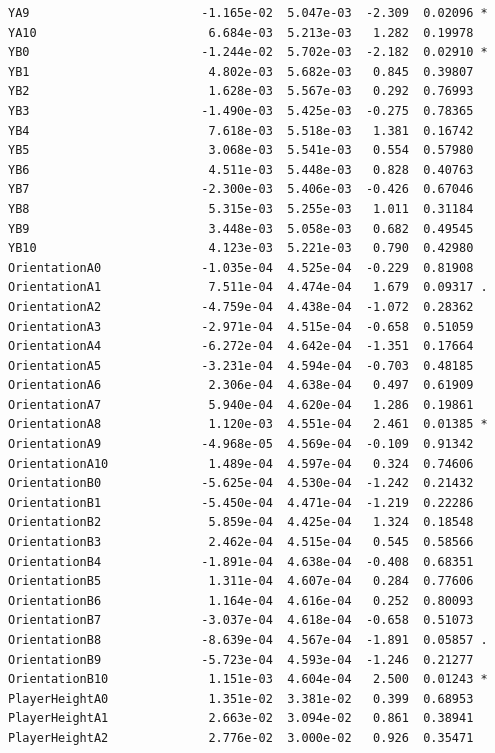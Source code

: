 \documentclass[
  super,
  preprint,
  3p]{elsarticle}
\begin{document}
\begin{verbatim}
YA9                        -1.165e-02  5.047e-03  -2.309  0.02096 *  
YA10                        6.684e-03  5.213e-03   1.282  0.19978    
YB0                        -1.244e-02  5.702e-03  -2.182  0.02910 *  
YB1                         4.802e-03  5.682e-03   0.845  0.39807    
YB2                         1.628e-03  5.567e-03   0.292  0.76993    
YB3                        -1.490e-03  5.425e-03  -0.275  0.78365    
YB4                         7.618e-03  5.518e-03   1.381  0.16742    
YB5                         3.068e-03  5.541e-03   0.554  0.57980    
YB6                         4.511e-03  5.448e-03   0.828  0.40763    
YB7                        -2.300e-03  5.406e-03  -0.426  0.67046    
YB8                         5.315e-03  5.255e-03   1.011  0.31184    
YB9                         3.448e-03  5.058e-03   0.682  0.49545    
YB10                        4.123e-03  5.221e-03   0.790  0.42980    
OrientationA0              -1.035e-04  4.525e-04  -0.229  0.81908    
OrientationA1               7.511e-04  4.474e-04   1.679  0.09317 .  
OrientationA2              -4.759e-04  4.438e-04  -1.072  0.28362    
OrientationA3              -2.971e-04  4.515e-04  -0.658  0.51059    
OrientationA4              -6.272e-04  4.642e-04  -1.351  0.17664    
OrientationA5              -3.231e-04  4.594e-04  -0.703  0.48185    
OrientationA6               2.306e-04  4.638e-04   0.497  0.61909    
OrientationA7               5.940e-04  4.620e-04   1.286  0.19861    
OrientationA8               1.120e-03  4.551e-04   2.461  0.01385 *  
OrientationA9              -4.968e-05  4.569e-04  -0.109  0.91342    
OrientationA10              1.489e-04  4.597e-04   0.324  0.74606    
OrientationB0              -5.625e-04  4.530e-04  -1.242  0.21432    
OrientationB1              -5.450e-04  4.471e-04  -1.219  0.22286    
OrientationB2               5.859e-04  4.425e-04   1.324  0.18548    
OrientationB3               2.462e-04  4.515e-04   0.545  0.58566    
OrientationB4              -1.891e-04  4.638e-04  -0.408  0.68351    
OrientationB5               1.311e-04  4.607e-04   0.284  0.77606    
OrientationB6               1.164e-04  4.616e-04   0.252  0.80093    
OrientationB7              -3.037e-04  4.618e-04  -0.658  0.51073    
OrientationB8              -8.639e-04  4.567e-04  -1.891  0.05857 .  
OrientationB9              -5.723e-04  4.593e-04  -1.246  0.21277    
OrientationB10              1.151e-03  4.604e-04   2.500  0.01243 *  
PlayerHeightA0              1.351e-02  3.381e-02   0.399  0.68953    
PlayerHeightA1              2.663e-02  3.094e-02   0.861  0.38941    
PlayerHeightA2              2.776e-02  3.000e-02   0.926  0.35471    

\end{verbatim}
\end{document}
